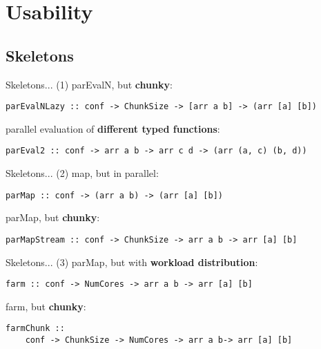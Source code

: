\section{Usability}
\subsection{Skeletons}
\begin{frame}[fragile]{Skeletons... (1)}
parEvalN, but \textbf{chunky}:
\begin{lstlisting}[frame=htrbl]
parEvalNLazy :: conf -> ChunkSize -> [arr a b] -> (arr [a] [b])
\end{lstlisting}
parallel evaluation of \textbf{different typed functions}:
\begin{lstlisting}[frame=htrbl]
parEval2 :: conf -> arr a b -> arr c d -> (arr (a, c) (b, d))
\end{lstlisting}
\end{frame}
\begin{frame}[fragile]{Skeletons... (2)}
map, but in parallel:
\begin{lstlisting}[frame=htrbl]
parMap :: conf -> (arr a b) -> (arr [a] [b])
\end{lstlisting}
parMap, but \textbf{chunky}:
\begin{lstlisting}[frame=htrbl]
parMapStream :: conf -> ChunkSize -> arr a b -> arr [a] [b]
\end{lstlisting}
\end{frame}
\begin{frame}[fragile]{Skeletons... (3)}
parMap, but with \textbf{workload distribution}:
\begin{lstlisting}[frame=htrbl]
farm :: conf -> NumCores -> arr a b -> arr [a] [b]
\end{lstlisting}
farm, but \textbf{chunky}:
\begin{lstlisting}[frame=htrbl]
farmChunk ::
	conf -> ChunkSize -> NumCores -> arr a b-> arr [a] [b]
\end{lstlisting}
\end{frame}